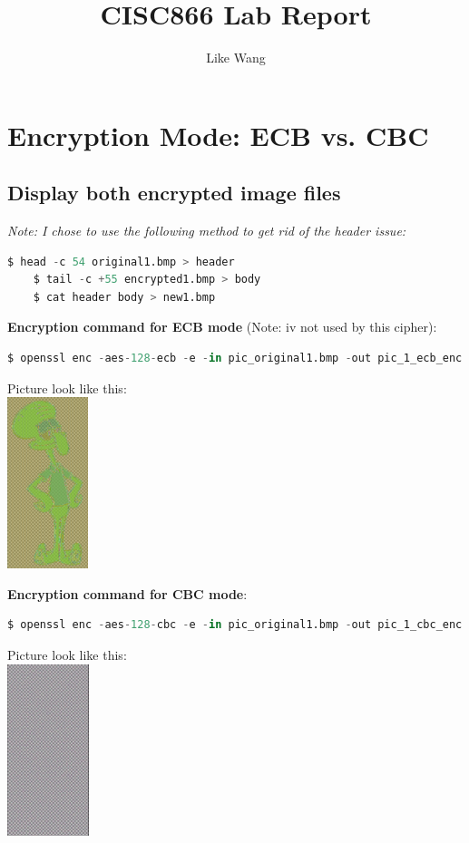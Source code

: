 \documentclass{article}
\title{CISC866 Lab Report}
\author{Like Wang}
\begin{document}
\maketitle

\section{Encryption Mode: ECB vs. CBC}

\subsection{Display both encrypted image files}

\textit{Note: I chose to use the following method to get rid of the header issue:}
\begin{lstlisting}[language=Python]
    $ head -c 54 original1.bmp > header
    $ tail -c +55 encrypted1.bmp > body
    $ cat header body > new1.bmp
\end{lstlisting}
\textbf{Encryption command for ECB mode} (Note: iv not used by this cipher):
\begin{lstlisting}[language=Python]
$ openssl enc -aes-128-ecb -e -in pic_original1.bmp -out pic_1_ecb_enc.bmp -K 00112233445566778889aabbccddeeff
\end{lstlisting}
Picture look like this:\\
\includegraphics[height=5cm]{images/pic_1_ecb.png}

\textbf{Encryption command for CBC mode}:
\begin{lstlisting}[language=Python]
$ openssl enc -aes-128-cbc -e -in pic_original1.bmp -out pic_1_cbc_enc.bmp -K 00112233445566778889aabbccddeeff -iv 0102030405060708090a0b0c0d0e0f10
\end{lstlisting}
Picture look like this:\\
\includegraphics[height=5cm]{images/pic_1_cbc.png}
\end{document}
